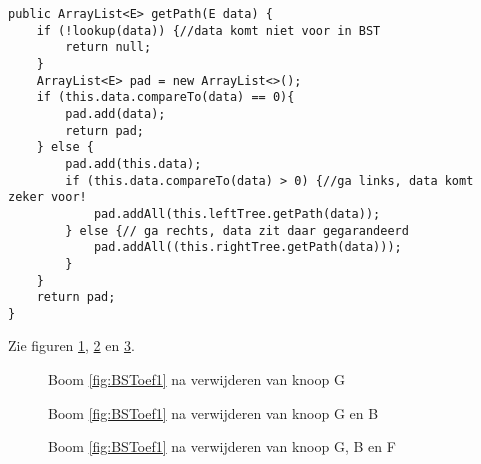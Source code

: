 \begin{Oplossing}{3.10}
\begin{lstlisting}[caption={getPath methode}, label=bstgetpath]
public ArrayList<E> getPath(E data) {
	if (!lookup(data)) {//data komt niet voor in BST
		return null;
	}
	ArrayList<E> pad = new ArrayList<>();
	if (this.data.compareTo(data) == 0){
		pad.add(data);
		return pad;
	} else {
		pad.add(this.data);
		if (this.data.compareTo(data) > 0) {//ga links, data komt zeker voor!
			pad.addAll(this.leftTree.getPath(data));
		} else {// ga rechts, data zit daar gegarandeerd
			pad.addAll((this.rightTree.getPath(data)));
		}
	}
	return pad;
}
\end{lstlisting}

\end{Oplossing}
\begin{Oplossing}{3.11}
Zie figuren \ref{fig:G}, \ref{fig:GB} en \ref{fig:GBF}.
\begin{figure}[H]
    \centering
{}
\caption{Boom \ref{fig:BSToef1} na verwijderen van knoop G}
\label{fig:G}
\end{figure}

\begin{figure}[H]
    \centering
{}
\caption{Boom \ref{fig:BSToef1} na verwijderen van knoop G en B}
\label{fig:GB}
\end{figure}

\begin{figure}[H]
    \centering
{}
\caption{Boom \ref{fig:BSToef1} na verwijderen van knoop G, B en F}
\label{fig:GBF}
\end{figure}


\end{Oplossing}
